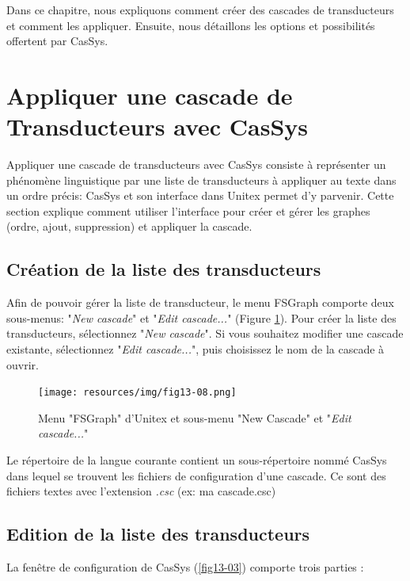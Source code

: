 \bigskip
\noindent Dans ce chapitre, nous expliquons comment créer des cascades de transducteurs et
comment les appliquer. Ensuite, nous détaillons les options et possibilités offertent par CasSys.

\section{Appliquer une cascade de Transducteurs avec CasSys}
\label{section:applyCascade}
Appliquer une cascade de transducteurs avec CasSys consiste à représenter un phénomène linguistique par une
liste de transducteurs à appliquer au texte dans un ordre précis: CasSys et son interface dans Unitex permet d'y parvenir.
Cette section explique comment utiliser l'interface pour créer et gérer les graphes (ordre, ajout, suppression) et appliquer la cascade.   

\subsection{Création de la liste des transducteurs}
\label{subsec:listTrans}

\bigskip
\noindent Afin de pouvoir gérer la liste de transducteur, le menu FSGraph comporte deux sous-menus:
"\textit{New cascade}" et "\textit{Edit cascade...}" (Figure \ref{fig13-08}). Pour créer la liste des
transducteurs, sélectionnez "\textit{New cascade}". Si vous souhaitez modifier une cascade existante, sélectionnez
"\textit{Edit cascade...}", puis  choisissez le nom de la cascade à ouvrir.

\begin{figure}[!htb]
 \centering
 \texttt{[image: resources/img/fig13-08.png]}
 \caption{Menu "FSGraph" d'Unitex et sous-menu "New Cascade" et "\textit{Edit cascade...}"}
 \label{fig13-08}
\end{figure}

Le répertoire de la langue courante contient un sous-répertoire nommé CasSys dans lequel se trouvent
les fichiers de configuration d'une cascade. Ce sont des fichiers textes avec l'extension \textit{.csc} (ex: ma cascade.csc)

\subsection{Edition de la liste des transducteurs}
\label{subsec:editlistTrans}

La fenêtre de configuration de CasSys (\ref{fig13-03}) comporte trois parties :


